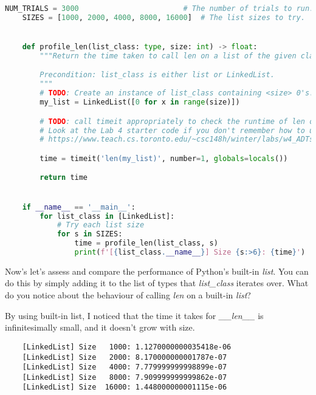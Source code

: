 \documentclass[12pt]{article}
\begin{document}
\begin{enumerate}[1.]
\begin{mdframed}
\begin{lstlisting}[language=python,caption={task\_2\_step\_3\_solution.py}]
    NUM_TRIALS = 3000                        # The number of trials to run.
    SIZES = [1000, 2000, 4000, 8000, 16000]  # The list sizes to try.


    def profile_len(list_class: type, size: int) -> float:
        """Return the time taken to call len on a list of the given class and size.

        Precondition: list_class is either list or LinkedList.
        """
        # TODO: Create an instance of list_class containing <size> 0's.
        my_list = LinkedList([0 for x in range(size)])

        # TODO: call timeit appropriately to check the runtime of len on the list.
        # Look at the Lab 4 starter code if you don't remember how to use timeit:
        # https://www.teach.cs.toronto.edu/~csc148h/winter/labs/w4_ADTs/starter-code/timequeue.py

        time = timeit('len(my_list)', number=1, globals=locals())

        return time


    if __name__ == '__main__':
        for list_class in [LinkedList]:
            # Try each list size
            for s in SIZES:
                time = profile_len(list_class, s)
                print(f'[{list_class.__name__}] Size {s:>6}: {time}')

    \end{lstlisting}

    \end{mdframed}

    \bigskip

    Now’s let’s assess and compare the performance of Python’s built-in \textit{list}.
    You can do this by simply adding it to the list of types that \textit{list\_class}
    iterates over. What do you notice about the behaviour of calling \textit{len} on
    a built-in \textit{list}?

    \bigskip

    \begin{mdframed}
    By using built-in list, I noticed that the time it takes for \textit{\_\_len\_\_}
    is infinitesimally small, and it doesn't grow with size.

    \begin{lstlisting}
    [LinkedList] Size   1000: 1.1270000000035418e-06
    [LinkedList] Size   2000: 8.170000000001787e-07
    [LinkedList] Size   4000: 7.779999999998899e-07
    [LinkedList] Size   8000: 7.909999999999862e-07
    [LinkedList] Size  16000: 1.448000000001115e-06
    \end{lstlisting}
    \end{mdframed}

\end{enumerate}
\end{document}
